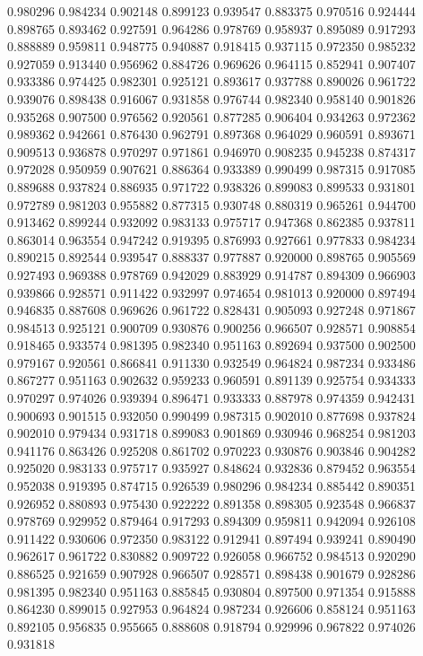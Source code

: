 0.980296
0.984234
0.902148
0.899123
0.939547
0.883375
0.970516
0.924444
0.898765
0.893462
0.927591
0.964286
0.978769
0.958937
0.895089
0.917293
0.888889
0.959811
0.948775
0.940887
0.918415
0.937115
0.972350
0.985232
0.927059
0.913440
0.956962
0.884726
0.969626
0.964115
0.852941
0.907407
0.933386
0.974425
0.982301
0.925121
0.893617
0.937788
0.890026
0.961722
0.939076
0.898438
0.916067
0.931858
0.976744
0.982340
0.958140
0.901826
0.935268
0.907500
0.976562
0.920561
0.877285
0.906404
0.934263
0.972362
0.989362
0.942661
0.876430
0.962791
0.897368
0.964029
0.960591
0.893671
0.909513
0.936878
0.970297
0.971861
0.946970
0.908235
0.945238
0.874317
0.972028
0.950959
0.907621
0.886364
0.933389
0.990499
0.987315
0.917085
0.889688
0.937824
0.886935
0.971722
0.938326
0.899083
0.899533
0.931801
0.972789
0.981203
0.955882
0.877315
0.930748
0.880319
0.965261
0.944700
0.913462
0.899244
0.932092
0.983133
0.975717
0.947368
0.862385
0.937811
0.863014
0.963554
0.947242
0.919395
0.876993
0.927661
0.977833
0.984234
0.890215
0.892544
0.939547
0.888337
0.977887
0.920000
0.898765
0.905569
0.927493
0.969388
0.978769
0.942029
0.883929
0.914787
0.894309
0.966903
0.939866
0.928571
0.911422
0.932997
0.974654
0.981013
0.920000
0.897494
0.946835
0.887608
0.969626
0.961722
0.828431
0.905093
0.927248
0.971867
0.984513
0.925121
0.900709
0.930876
0.900256
0.966507
0.928571
0.908854
0.918465
0.933574
0.981395
0.982340
0.951163
0.892694
0.937500
0.902500
0.979167
0.920561
0.866841
0.911330
0.932549
0.964824
0.987234
0.933486
0.867277
0.951163
0.902632
0.959233
0.960591
0.891139
0.925754
0.934333
0.970297
0.974026
0.939394
0.896471
0.933333
0.887978
0.974359
0.942431
0.900693
0.901515
0.932050
0.990499
0.987315
0.902010
0.877698
0.937824
0.902010
0.979434
0.931718
0.899083
0.901869
0.930946
0.968254
0.981203
0.941176
0.863426
0.925208
0.861702
0.970223
0.930876
0.903846
0.904282
0.925020
0.983133
0.975717
0.935927
0.848624
0.932836
0.879452
0.963554
0.952038
0.919395
0.874715
0.926539
0.980296
0.984234
0.885442
0.890351
0.926952
0.880893
0.975430
0.922222
0.891358
0.898305
0.923548
0.966837
0.978769
0.929952
0.879464
0.917293
0.894309
0.959811
0.942094
0.926108
0.911422
0.930606
0.972350
0.983122
0.912941
0.897494
0.939241
0.890490
0.962617
0.961722
0.830882
0.909722
0.926058
0.966752
0.984513
0.920290
0.886525
0.921659
0.907928
0.966507
0.928571
0.898438
0.901679
0.928286
0.981395
0.982340
0.951163
0.885845
0.930804
0.897500
0.971354
0.915888
0.864230
0.899015
0.927953
0.964824
0.987234
0.926606
0.858124
0.951163
0.892105
0.956835
0.955665
0.888608
0.918794
0.929996
0.967822
0.974026
0.931818

